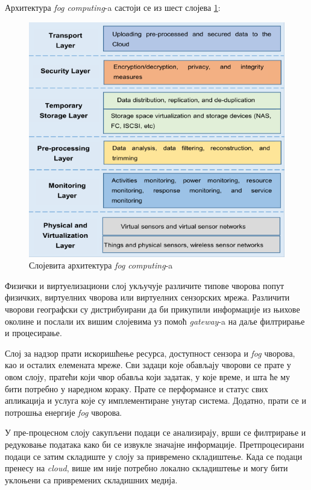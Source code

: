 Архитектура \textit{fog computing}-a састоји се из шест слојева \ref{fig:fog_layers}:

\begin{figure}[H]
    \centering
    \includegraphics[width=1\textwidth]{images/fog_layers.png}
    \caption{Слојевита архитектура \textit{fog computing}-a}
    \label{fig:fog_layers}
\end{figure}

Физички и виртуелизациони слој укључује различите типове чворова попут физичких, виртуелних чворова или виртуелних сензорских мрежа. Различити чворови географски су дистрибуирани да би прикупили информације из њихове околине и послали их вишим слојевима уз помоћ \textit{gateway}-a на даље филтрирање и процесирање.

Слој за надзор прати искоришћење ресурса, доступност сензора и \textit{fog} чворова, као и осталих елемената мреже. Сви задаци које обављају чворови се прате у овом слоју, пратећи који чвор обавља који задатак, у које време, и шта ће му бити потребно у наредном кораку. Прате се перформансе и статус свих апликација и услуга које су имплементиране унутар система. Додатно, прати се и потрошња енергије \textit{fog} чворова.

У пре-процесном слоју сакупљени подаци се анализирају, врши се филтрирање и редуковање података како би се извукле значајне информације. Претпроцесирани подаци се затим складиште у слоју за привремено складиштење. Када се подаци пренесу на \textit{cloud}, више им није потребно локално складиштење и могу бити уклоњени са привремених складишних медија.

